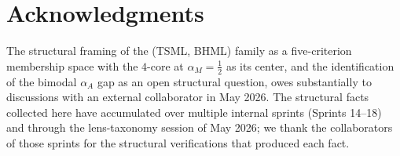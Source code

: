 \documentclass[11pt,reqno]{amsart}
\theoremstyle{plain}
\theoremstyle{definition}
\theoremstyle{remark}
\begin{document}
\section*{Acknowledgments}
The structural framing of the (TSML, BHML) family as a five-criterion
membership space with the $4$-core at $\alpha_M = \tfrac12$ as its
center, and the identification of the bimodal $\alpha_A$ gap as an
open structural question, owes substantially to discussions with an
external collaborator in May 2026. The structural facts collected
here have accumulated over multiple internal sprints (Sprints 14--18)
and through the lens-taxonomy session of May 2026; we thank the
collaborators of those sprints for the structural verifications that
produced each fact.
\end{document}
